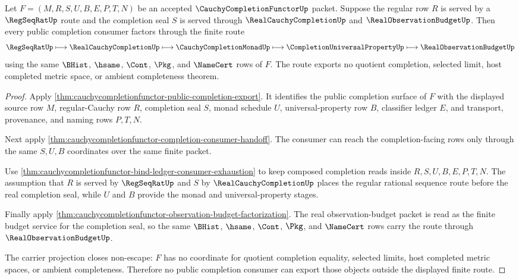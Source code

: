 \begin{theorem}
\label{thm:cauchycompletionfunctor-regseq-real-endofunctor}
Let $F=(M,R,S,U,B,E,P,T,N)$ be an accepted $\CauchyCompletionFunctorUp$ packet. Suppose the regular row $R$ is served by a $\RegSeqRatUp$ route and the completion seal $S$ is served through $\RealCauchyCompletionUp$ and $\RealObservationBudgetUp$. Then every public completion consumer factors through the finite route
$$
\RegSeqRatUp \longmapsto \RealCauchyCompletionUp \longmapsto \CauchyCompletionMonadUp \longmapsto \CompletionUniversalPropertyUp \longmapsto \RealObservationBudgetUp
$$
using the same $\BHist$, $\hsame$, $\Cont$, $\Pkg$, and $\NameCert$ rows of $F$. The route exports no quotient completion, selected limit, host completed metric space, or ambient completeness theorem.
\end{theorem}
\begin{proof}
Apply \autoref{thm:cauchycompletionfunctor-public-completion-export}. It identifies the public completion surface of $F$ with the displayed source row $M$, regular-Cauchy row $R$, completion seal $S$, monad schedule $U$, universal-property row $B$, classifier ledger $E$, and transport, provenance, and naming rows $P,T,N$.

Next apply \autoref{thm:cauchycompletionfunctor-completion-consumer-handoff}. The consumer can reach the completion-facing rows only through the same $S,U,B$ coordinates over the same finite packet.

Use \autoref{thm:cauchycompletionfunctor-bind-ledger-consumer-exhaustion} to keep composed completion reads inside $R,S,U,B,E,P,T,N$. The assumption that $R$ is served by $\RegSeqRatUp$ and $S$ by $\RealCauchyCompletionUp$ places the regular rational sequence route before the real completion seal, while $U$ and $B$ provide the monad and universal-property stages.

Finally apply \autoref{thm:cauchycompletionfunctor-observation-budget-factorization}. The real observation-budget packet is read as the finite budget service for the completion seal, so the same $\BHist$, $\hsame$, $\Cont$, $\Pkg$, and $\NameCert$ rows carry the route through $\RealObservationBudgetUp$.

The carrier projection closes non-escape: $F$ has no coordinate for quotient completion equality, selected limits, host completed metric spaces, or ambient completeness. Therefore no public completion consumer can export those objects outside the displayed finite route.
\end{proof}

